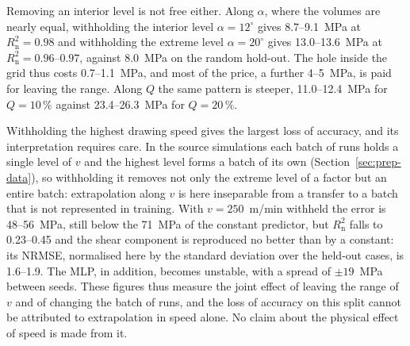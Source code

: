 \documentclass[subscriptcorrection,upint,varvw,barcolor=Goldenrod3,mathalfa=cal=euler,balance,hyphenate,french,pdf-a]{asmejour} %
\begin{document}
Removing an interior level is not free either. Along $\alpha$, where the volumes are nearly equal, withholding the interior level $\alpha=12^\circ$ gives 8.7--9.1~MPa at $R^2_{\mathrm{n}}=0.98$ and withholding the extreme level $\alpha=20^\circ$ gives 13.0--13.6~MPa at $R^2_{\mathrm{n}}=0.96$--$0.97$, against 8.0~MPa on the random hold-out. The hole inside the grid thus costs 0.7--1.1~MPa, and most of the price, a further 4--5~MPa, is paid for leaving the range.
Along $Q$ the same pattern is steeper, 11.0--12.4~MPa for $Q=10\,\%$ against 23.4--26.3~MPa for $Q=20\,\%$.

Withholding the highest drawing speed gives the largest loss of accuracy, and its interpretation requires care. In the source simulations each batch of runs holds a single level of $v$ and the highest level forms a batch of its own (Section~\ref{sec:prep-data}), so withholding it removes not only the extreme level of a factor but an entire batch: extrapolation along $v$ is here inseparable from a transfer to a batch that is not represented in training. With $v=250$~m/min withheld the error is 48--56~MPa, still below the 71~MPa of the constant predictor, but $R^2_{\mathrm{n}}$ falls to 0.23--0.45 and the shear component is reproduced no better than by a constant: its NRMSE, normalised here by the standard deviation over the held-out cases, is 1.6--1.9. The MLP, in addition, %
becomes unstable, with a spread of $\pm19$~MPa between seeds. These figures thus measure the joint effect of leaving the range of $v$ and of changing the batch of runs, and the loss of accuracy on this split cannot be attributed to extrapolation in speed alone. No claim about the physical effect of speed is made from it. %
\end{document}
